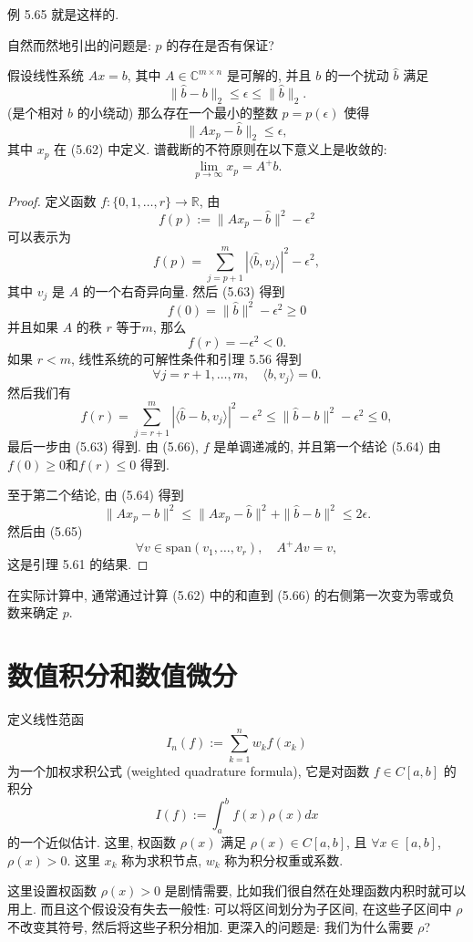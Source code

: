 \documentclass[a4paper]{ctexart}
\newcommand{\hl}[1]
{\noindent {\bf {#1}}}
\begin{document}
{例 5.65 就是这样的. 

自然而然地引出的问题是: $p$ 的存在是否有保证? 

\hl{定理5.66} 假设线性系统 $Ax = b$, 其中 $A \in \mathbb{C}^{m \times n}$ 
是可解的, 并且 $b$ 的一个扰动 $\hat{b}$ 满足
\[ 
\|\hat{b} - b\|_2 \leq \epsilon \leq \|\hat{b}\|_2. 
\]
(是个相对 $b$ 的小绕动) 那么存在一个最小的整数 $p = p(\epsilon)$ 使得
\[ 
\|A x_p - \hat{b}\|_2 \leq \epsilon, 
\]
其中 $x_p$ 在 (5.62) 中定义. 谱截断的不符原则在以下意义上是收敛的:
\[ 
\lim_{p \to \infty} x_p = A^+ b. 
\]

\begin{proof}
定义函数 $f : \{0, 1, \ldots, r\} \rightarrow \mathbb{R}$, 
由
\[ 
f(p) := \|Ax_p - \hat{b}\|^2 - \epsilon^2 
\]
可以表示为
\[ 
f(p) = \sum_{j = p + 1}^{m} \left| \langle \hat{b}, v_j \rangle \right|^2 - \epsilon^2, 
\]
其中 $v_j$ 是 $A$ 的一个右奇异向量. 然后 (5.63) 得到
\[ 
f(0) = \|\hat{b}\|^2 - \epsilon^2 \geq 0 
\]
并且如果 $A$ 的秩 $r$ 等于$m$, 那么
\[ 
f(r) = -\epsilon^2 < 0. 
\]
如果 $r < m$, 线性系统的可解性条件和引理 5.56 得到
\[ 
\forall j = r + 1, \ldots, m, \quad \langle b, v_j \rangle = 0. 
\]
然后我们有
\[ 
f(r) = \sum_{j=r+1}^{m} \left| \langle \hat{b} - b, v_j \rangle \right|^2 - \epsilon^2 
\leq \|\hat{b} - b\|^2 - \epsilon^2 \leq 0, 
\]
最后一步由 (5.63) 得到. 由 (5.66), $f$ 是单调递减的, 
并且第一个结论 (5.64) 由 $f(0) \geq 0$和$f(r) \leq 0$ 得到. 

至于第二个结论, 由 (5.64) 得到
\[ 
\|Ax_p - b\|^2 \leq \|Ax_p - \hat{b}\|^2 + \|\hat{b} - b\|^2 \leq 2\epsilon. 
\]
然后由 (5.65)
\[ 
\forall v \in \text{span}(v_1, \ldots, v_r), \quad A^+Av = v, 
\]
这是引理 5.61 的结果. 
\end{proof}

在实际计算中, 通常通过计算 (5.62) 中的和直到 (5.66) 的右侧第一次变为零或负数来确定 $p$. 

\section{数值积分和数值微分}

\hl{定义 6.1} 定义线性范函 
$$
I_n(f) := \sum_{k = 1}^n w_k f(x_k)
$$
为一个加权求积公式 (weighted quadrature formula), 它是对函数 $f \in C[a, b]$ 的积分
$$
I(f) := \int_a^b f(x) \rho(x) dx
$$
的一个近似估计. 这里, 权函数 $\rho(x)$ 满足 $\rho(x) \in C[a, b]$, 
且 $\forall x \in [a, b]$, $\rho(x) > 0$. 这里 $x_k$ 称为求积节点, $w_k$ 
称为积分权重或系数.

这里设置权函数 $\rho(x) > 0$ 是剧情需要, 比如我们很自然在处理函数内积时就可以用上. 
而且这个假设没有失去一般性: 可以将区间划分为子区间, 在这些子区间中 $\rho$ 不改变其符号, 然后将这些子积分相加. 
更深入的问题是: 我们为什么需要 $\rho$?

}
\end{document}
